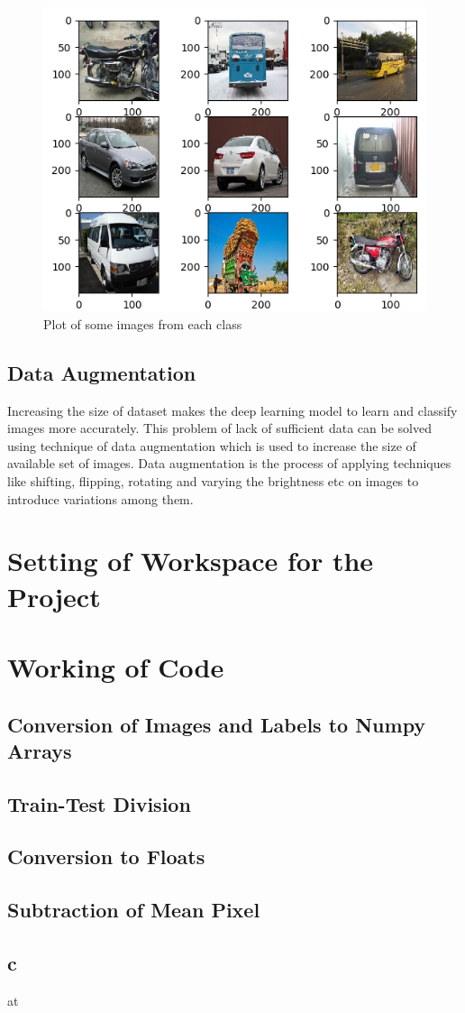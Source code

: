 \begin{figure}[H]
    \centering
    \captionsetup{justification = centering}
    \includegraphics[scale = 0.8]{CHAPTERS/Chapter-4/Images/4.1.png}
    \caption{Plot of some images from each class} 
    \label{fig:4.1}
  \end{figure}

\subsection{Data Augmentation}
Increasing the size of dataset makes the deep learning model to learn and classify images more accurately. This problem of lack of sufficient data can be solved using technique of data augmentation which is used to increase the size of available set of images.
Data augmentation is the process of applying techniques like shifting, flipping, rotating and varying the brightness etc on images to introduce variations among them.

\section{Setting of Workspace for the Project}
\section{Working of Code}
\subsection{Conversion of Images and Labels to Numpy Arrays}
\subsection{Train-Test Division}
\subsection{Conversion to Floats}
\subsection{Subtraction of Mean Pixel}
\subsection{c}at
